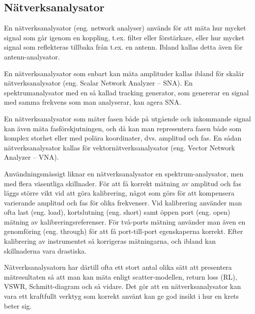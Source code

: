 \subsection{Nätverksanalysator}

En nätverksanalysator (eng. network analyser) används för att mäta hur mycket
signal som går igenom en koppling, t.ex. filter eller förstärkare, eller hur
mycket signal som reflekteras tillbaka från t.ex. en antenn.
Ibland kallas detta även för antenn-analysator.

En nätverksanalysator som enbart kan mäta amplituder kallas ibland för
skalär nätverksanalysator (eng. Scalar Network Analyzer -- SNA).
En spektrumanalysator med en så kallad tracking generator, som genererar en
signal med samma frekvens som man analyserar, kan agera SNA.

En nätverksanalysator som mäter fasen både på utgående och inkommande signal
kan även mäta fasförskjutningen, och då kan man representera fasen både som
komplex storhet eller med polära koordinater, dvs. amplitud och fas.
En sådan nätverksanalysator kallas för vektornätverksanalysator (eng.
Vector Network Analyzer -- VNA).

Användningsmässigt liknar en nätverksanalysator en spektrum-analysator, men
med flera väsentliga skillnader.
För att få korrekt mätning av amplitud och fas läggs större vikt vid att göra
kalibrering, något som görs för att kompensera varierande amplitud och fas
för olika frekvenser.
Vid kalibrering använder man ofta last (eng. load), kortslutning (eng. short)
samt öppen port (eng. open) mätning av kalibreringsreferenser.
För två-ports mätning använder man även en genomföring (eng. through) för att
få port-till-port egenskaperna korrekt.
Efter kalibrering av instrumentet så korrigeras mätningarna, och ibland kan
skillnaderna vara drastiska.

Nätverksanalysatorn har därtill ofta ett stort antal olika sätt att presentera
mätresultaten så att man kan mäta enligt scatter-modellen, return loss (RL),
VSWR, Schmitt-diagram och så vidare.
Det gör att en nätverksanalysator kan vara ett kraftfullt verktyg som korrekt
använt kan ge god insikt i hur en krets beter sig.

